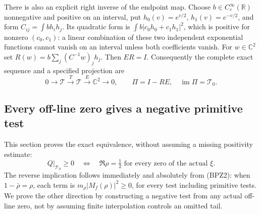 There is also an explicit right inverse of the endpoint map.
Choose $b\in C_c^\infty(\mathbb R)$ nonnegative and positive on an
interval, put $h_0(v)=e^{v/2}$, $h_1(v)=e^{-v/2}$, and form
$C_{ij}=\int b h_i h_j$. Its quadratic form is
$\int b|c_0h_0+c_1h_1|^2$, which is positive for nonzero
$(c_0,c_1)$: a linear combination of these two independent exponential
functions cannot vanish on an interval unless both coefficients vanish.
For $w\in\mathbb C^2$ set $R(w)=b\sum_j(C^{-1}w)_j h_j$.
Then $ER=I$. Consequently the complete exact sequence and a specified
projection are
\begin{equation}\tag{BPZ11}
 0\longrightarrow\mathcal T\xrightarrow{T}\mathcal T
   \xrightarrow{E}\mathbb C^2\longrightarrow0,
 \qquad \Pi=I-RE,\quad \operatorname{im}\Pi=\mathcal T_0.
\end{equation}

\subsection{Every off-line zero gives a negative primitive test}

This section proves the exact equivalence, without assuming a missing
positivity estimate:
\begin{equation}\tag{BPZ12}
 \boxed{\quad Q|_{\mathcal T_0}\ge0
 \quad\Longleftrightarrow\quad
 \Re\rho=\tfrac12\text{ for every zero of the actual }\xi.\quad}
\end{equation}
The reverse implication follows immediately and absolutely from
(BPZ2): when $1-\bar\rho=\rho$, each term is
$m_\rho|M_f(\rho)|^2\ge0$, for every test including primitive tests.
We prove the other direction by constructing a negative test from any
actual off-line zero, not by assuming finite interpolation controls
an omitted tail.


